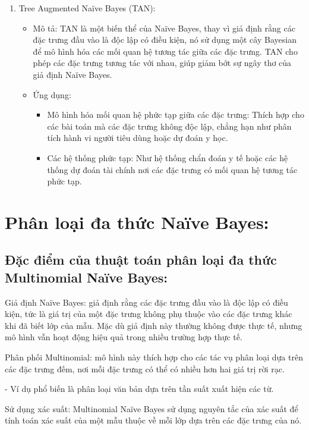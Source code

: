 \begin{enumerate}
\begin{itemize}
\end{itemize}
\item Tree Augmented Naïve Bayes (TAN):
\begin{itemize}
    \item Mô tả: TAN là một biến thể của Naïve Bayes, thay vì giả định rằng các đặc trưng đầu vào là độc lập có điều kiện, nó sử dụng một cây Bayesian để mô hình hóa các mối quan hệ tương tác giữa các đặc trưng. TAN cho phép các đặc trưng tương tác với nhau, giúp giảm bớt sự ngây thơ của giả định Naïve Bayes.
    \item Ứng dụng:
    \begin{itemize}
        \item Mô hình hóa mối quan hệ phức tạp giữa các đặc trưng: Thích hợp cho các bài toán mà các đặc trưng không độc lập, chẳng hạn như phân tích hành vi người tiêu dùng hoặc dự đoán y học.
        \item Các hệ thống phức tạp: Như hệ thống chẩn đoán y tế hoặc các hệ thống dự đoán tài chính nơi các đặc trưng có mối quan hệ tương tác phức tạp.
    \end{itemize}
\end{itemize}

\end{enumerate}

\section{Phân loại đa thức Naïve Bayes:}

\subsection{Đặc điểm của thuật toán phân loại đa thức Multinomial Naïve Bayes:}

Giả định Naïve Bayes: giả định rằng các đặc trưng đầu vào là độc lập có điều kiện, tức là giá trị của một đặc trưng không phụ thuộc vào các đặc trưng khác khi đã biết lớp của mẫu. Mặc dù giả định này thường không được thực tế, nhưng mô hình vẫn hoạt động hiệu quả trong nhiều trường hợp thực tế.

Phân phối Multinomial: mô hình này thích hợp cho các tác vụ phân loại dựa trên các đặc trưng đếm, nơi mỗi đặc trưng có thể có nhiều hơn hai giá trị rời rạc. 

-	Ví dụ phổ biến là phân loại văn bản dựa trên tần suất xuất hiện các từ.

Sử dụng xác suất: Multinomial Naïve Bayes sử dụng nguyên tắc của xác suất để tính toán xác suất của một mẫu thuộc về mỗi lớp dựa trên các đặc trưng của nó.

